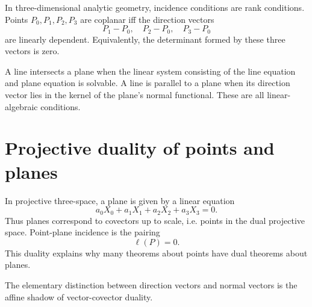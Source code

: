 In three-dimensional analytic geometry, incidence conditions are rank conditions.  Points $P_0,P_1,P_2,P_3$ are coplanar iff the direction vectors
\[
  P_1-P_0,\quad P_2-P_0,\quad P_3-P_0
\]
are linearly dependent.  Equivalently, the determinant formed by these three vectors is zero.

A line intersects a plane when the linear system consisting of the line equation and plane equation is solvable.  A line is parallel to a plane when its direction vector lies in the kernel of the plane's normal functional.  These are all linear-algebraic conditions.

\section{Projective duality of points and planes}

In projective three-space, a plane is given by a linear equation
\[
  a_0X_0+a_1X_1+a_2X_2+a_3X_3=0.
\]
Thus planes correspond to covectors up to scale, i.e. points in the dual projective space.  Point-plane incidence is the pairing
\[
  \ell(P)=0.
\]
This duality explains why many theorems about points have dual theorems about planes.

The elementary distinction between direction vectors and normal vectors is the affine shadow of vector-covector duality.
